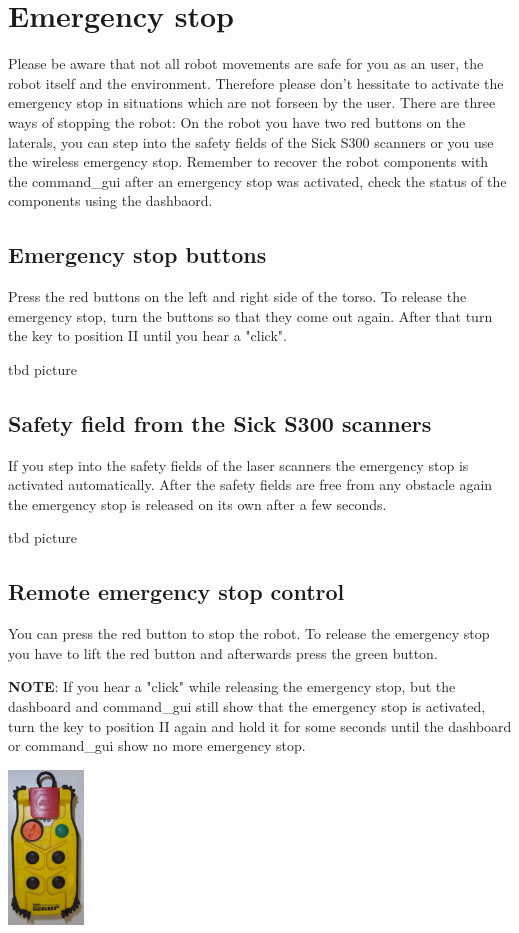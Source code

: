 \section{Emergency stop} 
Please be aware that not all robot movements are safe for you as an user, the robot itself and the environment. Therefore please don't hessitate to activate the emergency stop in situations which are not forseen by the user. There are three ways of stopping the robot: On the robot you have two red buttons on the laterals, you can step into the safety fields of the Sick S300 scanners or you use the wireless emergency stop. Remember to recover the robot components with the command\_gui after an emergency stop was activated, check the status of the components using the dashbaord.

\subsection{Emergency stop buttons}
Press the red buttons on the left and right side of the torso. To release the emergency stop, turn the buttons so that they come out again. After that turn the key to position II until you hear a "click".

tbd picture

\subsection{Safety field from the Sick S300 scanners}
If you step into the safety fields of the laser scanners the emergency stop is activated automatically. After the safety fields are free from any obstacle again the emergency stop is released on its own after a few seconds.

tbd picture

\subsection{Remote emergency stop control}
You can press the red button to stop the robot. To release the emergency stop you have to lift the red button and afterwards press the green button.


\textbf{NOTE}: If you hear a "click" while releasing the emergency stop, but the dashboard and command\_gui still show that the emergency stop is activated, turn the key to position II again and hold it for some seconds until the dashboard or command\_gui show no more emergency stop.

\begin{center}
\includegraphics[width=0.15\textwidth]{images/em_stop.png}
\end{center}


